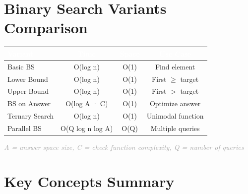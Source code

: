 \documentclass[11pt,a4paper,oneside]{book}
\begin{document}
\vspace{2cm}


\chapter*{Binary Search Variants Comparison}

\begin{center}
\begin{tcolorbox}[
    enhanced,
    colback=white,
    colframe=primaryblue,
    boxrule=2pt,
    arc=4mm,
    width=0.95\textwidth
]
\begin{tabular}{|l|c|c|c|}
\hline
\rowcolor{primaryblue}
\textcolor{white}{\textbf{Variant}} & \textcolor{white}{\textbf{Time}} & \textcolor{white}{\textbf{Space}} & \textcolor{white}{\textbf{Use Case}} \\
\hline
Basic BS & O(log n) & O(1) & Find element \\
\hline
Lower Bound & O(log n) & O(1) & First $\geq$ target \\
\hline
Upper Bound & O(log n) & O(1) & First $>$ target \\
\hline
BS on Answer & O(log A · C) & O(1) & Optimize answer \\
\hline
Ternary Search & O(log n) & O(1) & Unimodal function \\
\hline
Parallel BS & O(Q log n log A) & O(Q) & Multiple queries \\
\hline
\end{tabular}
\end{tcolorbox}
\end{center}

\vspace{1cm}

\begin{center}
\textit{\textcolor{darkgray}{A = answer space size, C = check function complexity, Q = number of queries}}
\end{center}

\vspace{2cm}


\chapter*{Key Concepts Summary}
\end{document}
